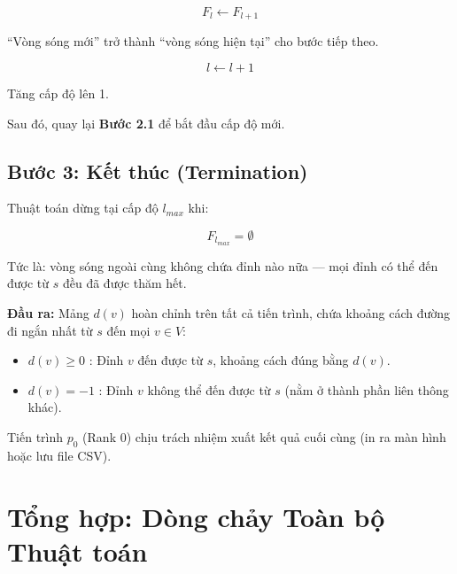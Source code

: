 \documentclass[12pt,a4paper]{article}
\begin{document}
\begin{equation}
F_l \leftarrow F_{l+1}
\end{equation}

\begin{explain}
``Vòng sóng mới'' trở thành ``vòng sóng hiện tại'' cho bước tiếp theo.
\end{explain}

\begin{equation}
l \leftarrow l + 1
\end{equation}

\begin{explain}
Tăng cấp độ lên 1.
\end{explain}

Sau đó, quay lại \textbf{Bước 2.1} để bắt đầu cấp độ mới.

\subsection{Bước 3: Kết thúc (Termination)}

Thuật toán dừng tại cấp độ $l_{max}$ khi:

\begin{equation}
F_{l_{max}} = \emptyset
\end{equation}

\begin{explain}
Tức là: vòng sóng ngoài cùng không chứa đỉnh nào nữa --- mọi đỉnh có thể đến được từ $s$ đều đã được thăm hết.
\end{explain}

\textbf{Đầu ra:} Mảng $d(v)$ hoàn chỉnh trên tất cả tiến trình, chứa khoảng cách đường đi ngắn nhất từ $s$ đến mọi $v \in V$:
\begin{itemize}
  \item $d(v) \geq 0$ : Đỉnh $v$ đến được từ $s$, khoảng cách đúng bằng $d(v)$.
  \item $d(v) = -1$ : Đỉnh $v$ không thể đến được từ $s$ (nằm ở thành phần liên thông khác).
\end{itemize}

Tiến trình $p_0$ (Rank 0) chịu trách nhiệm xuất kết quả cuối cùng (in ra màn hình hoặc lưu file CSV).

\section{Tổng hợp: Dòng chảy Toàn bộ Thuật toán}
\end{document}
